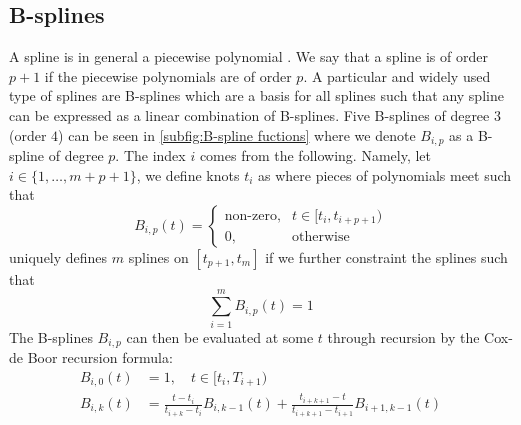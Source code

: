 \documentclass[../Thesis.tex]{subfiles}
\begin{document}
\subsection{B-splines}
A spline is in general a piecewise polynomial \cite{A-Practical-Guide-to-Splines}. We say that a spline is of order $p+1$ if the piecewise polynomials are of order $p$. A particular and widely used type of splines are B-splines which are a basis for all splines such that any spline can be expressed as a linear combination of B-splines. Five B-splines of degree $3$ (order $4$) can be seen in \autoref{subfig:B-spline fuctions} where we denote $B_{i,p}$ as a B-spline of degree $p$. The index $i$ comes from the following. Namely, let $i \in \{1,\dots, m + p + 1\}$, we define knots $t_i$ as where pieces of polynomials meet such that
$$B_{i,p} \left(t\right) = \begin{cases}
        \text{non-zero}, & t\in [t_i, t_{i+p+1}) \\
        0,               & \text{otherwise}
    \end{cases}$$
uniquely defines $m$ splines on $[t_{p+1}, t_{m}]$ if we further constraint the splines such that
$$\sum_{i=1}^{m} B_{i,p} \left(t\right) = 1$$
The B-splines $B_{i,p}$ can then be evaluated at some $t$ through recursion by the Cox-de Boor recursion formula:
\begin{align}
    B_{i,0}\left(t\right) & = 1, \quad t\in [t_i, T_{i+1})                                                                                                \\
    B_{i,k}\left(t\right) & = \frac{t-t_i}{t_{i+k} - t_{i}} B_{i,k-1}\left(t\right) + \frac{t_{i+k+1} - t}{t_{i+k+1} - t_{i+1}} B_{i+1,k-1}\left(t\right)
\end{align}
\end{document}
